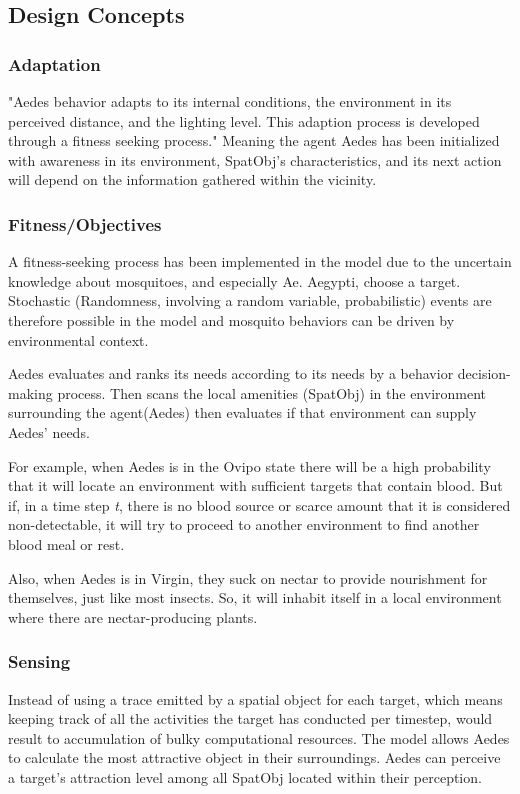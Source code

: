 \subsection{Design Concepts}

\subsubsection{Adaptation}
	"Aedes behavior adapts to its internal conditions, the environment in its perceived distance, and the lighting level. This adaption process is developed through a fitness seeking process." Meaning the agent Aedes has been initialized with awareness in its environment, SpatObj's characteristics, and its next action will depend on the information gathered within the vicinity.
\subsubsection{Fitness/Objectives}{
    A fitness-seeking process \cite{grimm}has been implemented in the model due to the uncertain knowledge about mosquitoes, and especially Ae. Aegypti, choose a target. Stochastic (Randomness, involving a random variable, probabilistic) events are therefore possible in the model and mosquito behaviors can be driven by environmental context.
    
	Aedes evaluates and ranks its needs according to its needs by a behavior decision-making process. Then scans the local amenities (SpatObj) in the environment surrounding the agent(Aedes) then evaluates if that environment can supply Aedes' needs.
	
	For example, when Aedes is in the Ovipo state there will be a high probability that it will locate an environment with sufficient targets that contain blood. But if, in a time step \textit{t}, there is no blood source or scarce amount that it is considered non-detectable, it will try to proceed to another environment to find another blood meal or rest.
	
	Also, when Aedes is in Virgin, they suck on nectar to provide nourishment for themselves, just like most insects. So, it will inhabit itself in a local environment where there are nectar-producing plants.

}
\subsubsection{Sensing}
Instead of using a trace emitted by a spatial object for each target\cite{cummins}, which means keeping track of all the activities the target has conducted per timestep, would result to accumulation of bulky computational resources. The model allows Aedes to calculate the most attractive object in their surroundings. Aedes can perceive a target’s attraction level among all SpatObj located within their perception.


